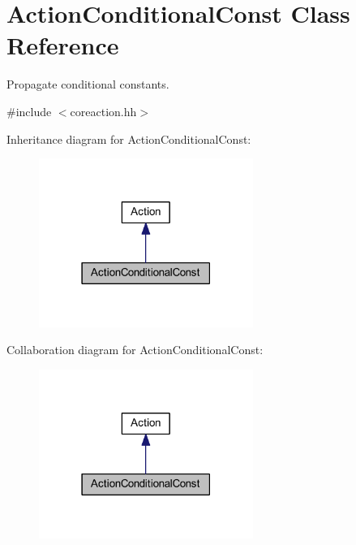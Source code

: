 \hypertarget{class_action_conditional_const}{}\section{Action\+Conditional\+Const Class Reference}
\label{class_action_conditional_const}


Propagate conditional constants.  




{\ttfamily \#include $<$coreaction.\+hh$>$}



Inheritance diagram for Action\+Conditional\+Const\+:
\nopagebreak
\begin{figure}[H]
\begin{center}
\leavevmode
\includegraphics[width=198pt]{class_action_conditional_const__inherit__graph}
\end{center}
\end{figure}


Collaboration diagram for Action\+Conditional\+Const\+:
\nopagebreak
\begin{figure}[H]
\begin{center}
\leavevmode
\includegraphics[width=198pt]{class_action_conditional_const__coll__graph}
\end{center}
\end{figure}

